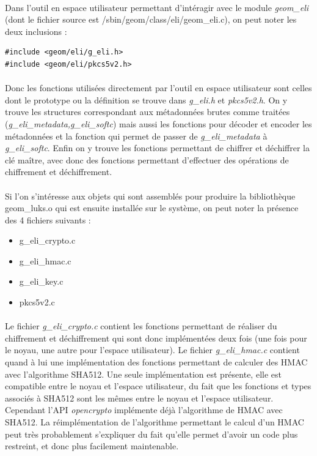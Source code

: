 \paragraph{}
Dans l'outil en espace utilisateur permettant d'intéragir avec le module 
{\em geom\_eli} (dont le fichier source est /sbin/geom/class/eli/geom\_eli.c),
on peut noter les deux inclusions :
\begin{lstlisting}
#include <geom/eli/g_eli.h>
#include <geom/eli/pkcs5v2.h>
\end{lstlisting}

\paragraph{}
Donc les fonctions utilisées directement par l'outil en espace utilisateur sont
celles dont le prototype ou la définition se trouve dans {\em g\_eli.h} et
{\em pkcs5v2.h}. On y trouve les structures correspondant aux métadonnées brutes
comme traitées ({\em g\_eli\_metadata,g\_eli\_softc}) mais aussi les fonctions
pour décoder et encoder les métadonnées et la fonction qui permet de passer de
{\em g\_eli\_metadata} à {\em g\_eli\_softc}. Enfin on y trouve les fonctions 
permettant de chiffrer et déchiffrer la clé maître, avec donc des fonctions
permettant d'effectuer des opérations de chiffrement et déchiffrement.


\paragraph{}
Si l'on s'intéresse aux objets qui sont assemblés pour produire la bibliothèque
geom\_luks.o qui est ensuite installée sur le système, on peut noter la présence
des 4 fichiers suivants :
\begin{itemize}
	\item g\_eli\_crypto.c
	\item g\_eli\_hmac.c
	\item g\_eli\_key.c
	\item pkcs5v2.c
\end{itemize}

\paragraph{}
Le fichier {\em g\_eli\_crypto.c} contient les fonctions permettant de réaliser
du chiffrement et déchiffrement qui sont donc implémentées deux fois (une fois
pour le noyau, une autre pour l'espace utilisateur). Le fichier
{\em g\_eli\_hmac.c} contient quand à lui une implémentation des fonctions
permettant de calculer des HMAC avec l'algorithme SHA512. Une seule implémentation
est présente, elle est compatible entre le noyau et l'espace utilisateur, du fait
que les fonctions et types associés à SHA512 sont les mêmes entre le noyau et
l'espace utilisateur.
Cependant l'API {\em opencrypto} implémente déjà l'algorithme de HMAC avec SHA512.
La réimplémentation de l'algorithme permettant le calcul d'un HMAC peut très
probablement s'expliquer du fait qu'elle permet d'avoir un code plus restreint,
et donc plus facilement maintenable.

